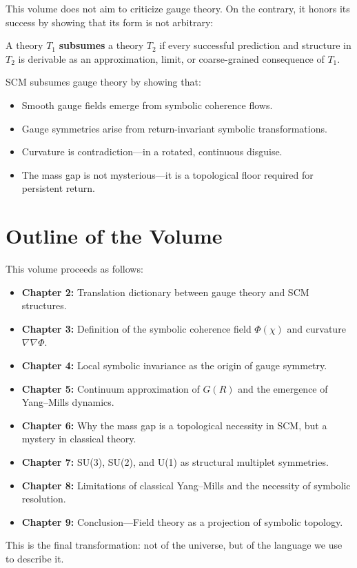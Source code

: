 This volume does not aim to criticize gauge theory. On the contrary, it honors its success by showing that its form is not arbitrary:

\begin{definition}
A theory $T_1$ \textbf{subsumes} a theory $T_2$ if every successful prediction and structure in $T_2$ is derivable as an approximation, limit, or coarse-grained consequence of $T_1$.
\end{definition}

\noindent
SCM subsumes gauge theory by showing that:

\begin{itemize}
    \item Smooth gauge fields emerge from symbolic coherence flows.
    \item Gauge symmetries arise from return-invariant symbolic transformations.
    \item Curvature is contradiction---in a rotated, continuous disguise.
    \item The mass gap is not mysterious---it is a topological floor required for persistent return.
\end{itemize}

\section{Outline of the Volume}

This volume proceeds as follows:

\begin{itemize}
    \item \textbf{Chapter 2:} Translation dictionary between gauge theory and SCM structures.
    \item \textbf{Chapter 3:} Definition of the symbolic coherence field $\Phi(\chi)$ and curvature $\nabla\nabla \Phi$.
    \item \textbf{Chapter 4:} Local symbolic invariance as the origin of gauge symmetry.
    \item \textbf{Chapter 5:} Continuum approximation of $G(R)$ and the emergence of Yang--Mills dynamics.
    \item \textbf{Chapter 6:} Why the mass gap is a topological necessity in SCM, but a mystery in classical theory.
    \item \textbf{Chapter 7:} SU(3), SU(2), and U(1) as structural multiplet symmetries.
    \item \textbf{Chapter 8:} Limitations of classical Yang--Mills and the necessity of symbolic resolution.
    \item \textbf{Chapter 9:} Conclusion—Field theory as a projection of symbolic topology.
\end{itemize}

This is the final transformation: not of the universe, but of the language we use to describe it.
